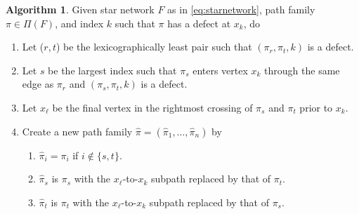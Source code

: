 \documentclass[12pt]{amsart}
\theoremstyle{definition}
\newtheorem{alg}[thm]{Algorithm}
\numberwithin{equation}{section}
\newcommand{\sn}{\mathfrak{S}_n}
\newcommand{\ctr}[1]{{x}_{#1}}
\newcommand{\cnet}[1]{\mathcal F^\bullet_{#1}}
\begin{document}
\begin{alg}\label{a:remove_early_defect_random_k}
    Given star network 
    $F$ as in \eqref{eq:starnetwork},
    path family $\pi \in \Pi(F)$,
    and index $k$ such that $\pi$ has a defect at $\ctr k$,
    do 
    \begin{enumerate}
    \item Let ($r, t$) be the lexicographically least pair such that $(\pi_r, \pi_t, k)$ is a defect.
    \item %
    Let $s$ be the largest index such that $\pi_s$ enters vertex $\ctr k$
    through the same edge as $\pi_r$ and $(\pi_s, \pi_t, k)$ is a defect.
    \item Let $\ctr \ell$ be the final vertex in the %
    rightmost crossing of 
    $\pi_s$ and $\pi_t$ prior to $\ctr k$. 
    \item Create a new path family $%
    \hat \pi = (\hat \pi_1, \dotsc, \hat \pi_n)$ by \begin{enumerate}
        \item $\hat \pi_i = \pi_i$ if $i \not \in \{s,t\}$.
        \item $\hat \pi_s$ is $\pi_s$ with the
        $\ctr \ell$-to-$\ctr k$ subpath replaced by that of $\pi_t$.
        \item $\hat \pi_t$ is $\pi_t$ with the
        $\ctr \ell$-to-$\ctr k$ subpath replaced by that of $\pi_s$.
       \end{enumerate}
    \end{enumerate}
\end{alg}
\end{document}
